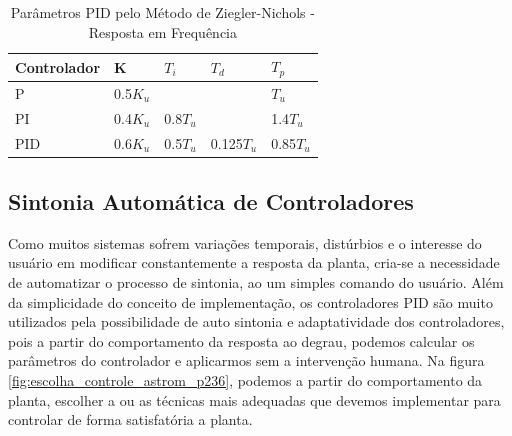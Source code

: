 \begin{table}
  \caption{Parâmetros PID pelo Método de Ziegler-Nichols - Resposta em Frequência}
  \label{tab:Ziegler-Nichols-freq}
  \centering%
  \begin{minipage}{.52\textwidth}
    \begin{tabular*}{\textwidth}{lllll}
      \hline
      {Controlador} & {K} & {$T_i$} & {$T_d$}& {$T_p$}\\ \hline
      \hline
      P    &  0.5$K_u$   &           &             & $T_u$  \\ 
      PI   &  0.4$K_u$   & 0.8$T_u$  &             & 1.4$T_u$ \\
      PID  &  0.6$K_u$   & 0.5$T_u$  & 0.125$T_u$  & 0.85$T_u$  \\ \hline
    \end{tabular*}
  \end{minipage}
\end{table}



\subsection{Sintonia Automática de Controladores}

Como muitos sistemas sofrem variações temporais, distúrbios e o interesse do usuário em modificar constantemente a resposta da planta, cria-se a necessidade de automatizar o processo de sintonia, ao um simples comando do usuário. Além da simplicidade do conceito de implementação, os controladores PID são muito utilizados pela possibilidade de auto sintonia e adaptatividade dos controladores, pois a partir do comportamento da resposta ao degrau, podemos calcular os parâmetros do controlador e aplicarmos sem a intervenção humana\cite{Astrom1995}. Na figura \ref{fig:escolha_controle_astrom_p236}, podemos a partir do comportamento da planta, escolher a ou as técnicas mais adequadas que devemos implementar para controlar de forma satisfatória a planta.


